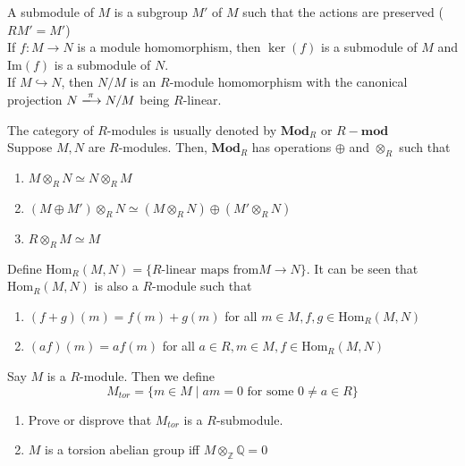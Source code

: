 \documentclass[oneside, 12pt]{scrbook}
\newcommand{\QQ}{\mathbb Q}
\newcommand{\ZZ}{\mathbb Z}
\newcommand{\Hom}{\mathrm{Hom}}
\theoremstyle{theorem}
\begin{document}
A submodule of $M$ is a subgroup $M'$ of $M$ such that the actions are preserved ($RM' = M'$)\\

If $f: M\rightarrow N$ is a module homomorphism, then $\ker(f)$ is a submodule of $M$ and $\mathrm{Im}(f)$ is a submodule of $N$. \\

If $M \hookrightarrow N$, then $N/M$ is an $R$-module homomorphism with the canonical projection $N \xlongrightarrow{\pi} N/M$ being $R$-linear.

\begin{remark}
The category of $R$-modules is usually denoted by $\mathbf{Mod}_{R}$ or $R-\mathbf{mod}$\\

Suppose $M,N$ are $R$-modules. Then, $\mathbf{Mod}_{R}$ has operations $\oplus $ and $\otimes_{R}$ such that 
\begin{enumerate}
\item $M \otimes_{R} N \simeq N \otimes_{R} M$
\item $(M \oplus M') \otimes_{R} N \simeq (M \otimes_{R} N) \oplus (M' \otimes_{R} N )$
\item $R \otimes_{R} M \simeq M$
\end{enumerate}
\end{remark}

\begin{remark}
Define $\Hom_{R}(M,N) = \{R\text{-linear maps from} M \rightarrow N\}$. It can be seen that $\Hom_{R}(M,N)$ is also a $R$-module such that 
\begin{enumerate}
\item $(f+g)(m) = f(m) + g(m)$ for all $m\in M, f,g \in \Hom_{R}(M,N)$
\item $(af)(m) = af(m)$ for all $a\in R, m\in M, f \in \Hom_{R}(M,N)$
\end{enumerate}
\end{remark}

\begin{definition}
Say $M$ is a $R$-module. Then we define 
\begin{equation}
M_{tor} = \{m \in M \mid am=0 \text{ for some } 0 \neq a \in R\}
\end{equation}
\end{definition}

\begin{exercise}
\begin{enumerate}
\item Prove or disprove that $M_{tor}$ is a $R$-submodule. 
\item $M$ is a torsion abelian group iff $M \otimes_{\ZZ} \QQ = 0$
\end{enumerate}
\end{exercise}
\end{document}
